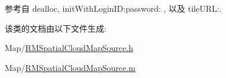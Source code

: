 参考自 dealloc, init\-With\-Login\-I\-D\-:password\-: , 以及 tile\-U\-R\-L\-:.



该类的文档由以下文件生成\-:\begin{DoxyCompactItemize}
\item 
Map/\hyperlink{_r_m_spatial_cloud_map_source_8h}{R\-M\-Spatial\-Cloud\-Map\-Source.\-h}\item 
Map/\hyperlink{_r_m_spatial_cloud_map_source_8m}{R\-M\-Spatial\-Cloud\-Map\-Source.\-m}\end{DoxyCompactItemize}
